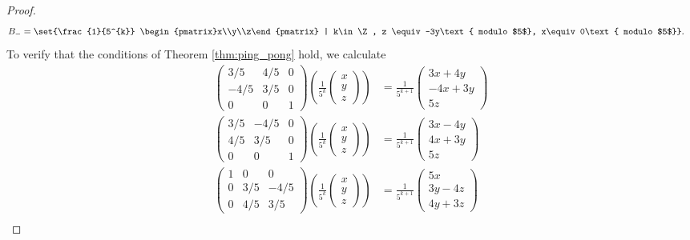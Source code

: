 \documentclass[10pt]{mypackage2}
\begin{document}
\begin{proof}
\begin{align*}
    B_{-} &= \set{\frac{1}{5^{k}} \begin{pmatrix}x\\y\\z\end{pmatrix} | k\in \Z, z \equiv -3y\text{ modulo $5$}, x\equiv 0\text{ modulo $5$}}.
  \end{align*}
  To verify that the conditions of Theorem \ref{thm:ping_pong} hold, we calculate
  \begin{align*}
    \begin{pmatrix}3/5 & 4/5 & 0 \\ -4/5 & 3/5 & 0 \\ 0 & 0 & 1\end{pmatrix}\left(\frac{1}{5^k} \begin{pmatrix}x\\y\\z\end{pmatrix}\right) &= \frac{1}{5^{k+1}} \begin{pmatrix}3x + 4y \\ -4x + 3y \\ 5z\end{pmatrix}\tag*{(1)}\\
    \begin{pmatrix}3/5 & -4/5 & 0 \\ 4/5 & 3/5 & 0 \\ 0 & 0 & 1\end{pmatrix} \left(\frac{1}{5^k} \begin{pmatrix}x\\y\\z\end{pmatrix}\right) &= \frac{1}{5^{k+1}} \begin{pmatrix}3x - 4y \\ 4x + 3y \\ 5z\end{pmatrix}\tag*{(2)}\\
    \begin{pmatrix}1 & 0 & 0 \\ 0 & 3/5 & -4/5 \\ 0 & 4/5 & 3/5\end{pmatrix}\left(\frac{1}{5^{k}} \begin{pmatrix}x\\y\\z\end{pmatrix}\right) &= \frac{1}{5^{k+1}} \begin{pmatrix}5x \\ 3y- 4z \\ 4y + 3z\end{pmatrix}\tag*{(3)}\\

\end{align*}
\end{proof}
\end{document}
